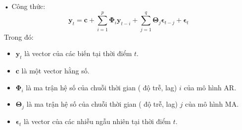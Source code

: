 \documentclass[conference]{IEEEtran}
\begin{document}
    • Công thức:
    \begin{equation}
        \mathbf{y}_t = \mathbf{c} + \sum_{i=1}^{p} \mathbf{\Phi}_i \mathbf{y}_{t-i} + \sum_{j=1}^{q} \mathbf{\Theta}_j \boldsymbol{\epsilon}_{t-j} + \boldsymbol{\epsilon}_t
    \end{equation}  
Trong đó:  
    \begin{itemize}
      \item \( \mathbf{y}_t \) là vector của các biến tại thời điểm \( t \).
      \item \( \mathbf{c} \) là một vector hằng số.
      \item \( \mathbf{\Phi}_i \) là ma trận hệ số của chuỗi thời gian ( độ trễ, lag) \( i \) của mô hình AR.
      \item \( \mathbf{\Theta}_j \) là ma trận hệ số của chuỗi thời gian ( độ trễ, lag) \( j \) của mô hình MA.
      \item \( \boldsymbol{\epsilon}_t \) là vector của các nhiễu ngẫu nhiên tại thời điểm \( t \).
    \end{itemize} 
\end{document}
